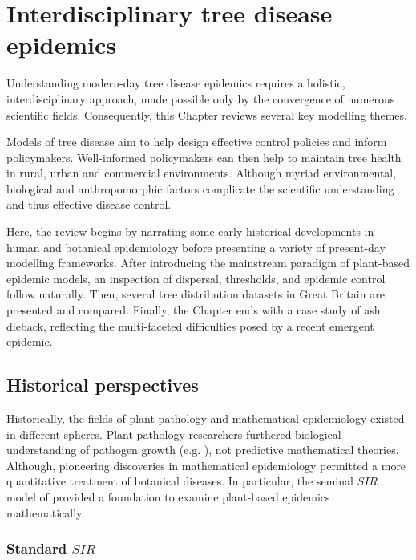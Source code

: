 \chapter{Interdisciplinary tree disease epidemics}
\label{chapter2:litreview} 

Understanding modern-day tree disease epidemics requires a holistic, interdisciplinary
approach, made possible only by the convergence of numerous scientific fields. 
Consequently, this Chapter reviews several key modelling themes.

Models of tree disease aim to help design effective control policies and inform policymakers.
Well-informed policymakers can then help to maintain tree health in rural, urban and commercial environments. 
Although myriad environmental, biological and anthropomorphic factors complicate the scientific understanding 
and thus effective disease control. 

Here, the review begins by narrating some early historical developments in human and botanical epidemiology before presenting
a variety of present-day modelling frameworks. After introducing the mainstream paradigm of plant-based epidemic models,
an inspection of dispersal, thresholds, and epidemic control follow naturally. Then, several tree distribution datasets in Great Britain are presented and compared. Finally, the Chapter ends with a case study of ash dieback, reflecting the multi-faceted 
difficulties posed by a recent emergent epidemic.

\section{Historical perspectives}

Historically, the fields of plant pathology and mathematical epidemiology existed in different spheres.
Plant pathology researchers furthered biological understanding of pathogen growth (e.g. \cite{doi:10.1146/annurev.py.01.090163.000245}), not predictive mathematical theories.
Although, pioneering discoveries in mathematical epidemiology permitted a more quantitative treatment of botanical diseases. 
In particular, the seminal $SIR$ model of \cite{kermack-model} 
provided a foundation to examine plant-based epidemics mathematically.

\subsection{Standard $SIR$}

